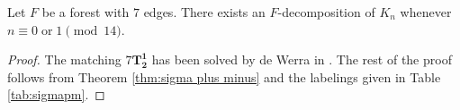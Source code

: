  \begin{thm}\label{thm:0 or 1 mod 14}
    Let $F$ be a forest with $7$ edges. There exists an $F$-decomposition of $K_n$ whenever $n \equiv 0 \; \textrm{or} \; 1 \pmod{14}.$
\end{thm}
\begin{proof}
    The matching $7\mathbf{T^{1}_{2}}$ has been solved by de Werra in \cite{deWerra1970}. The rest of the proof follows from Theorem \ref{thm:sigma plus minus} and the labelings given in Table \ref{tab:sigmapm}.

\end{proof}

